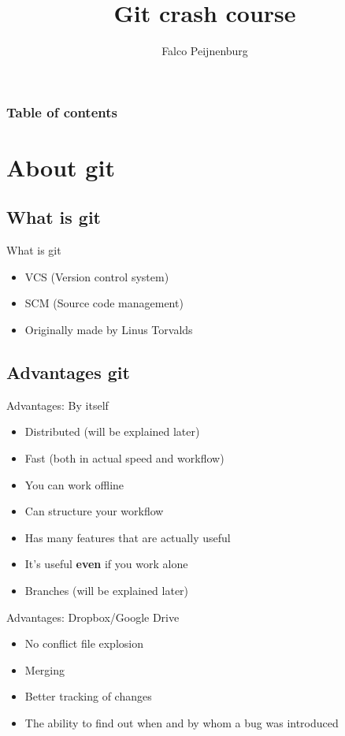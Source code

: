 \documentclass[10pt,a4paper]{beamer}
\author{Falco Peijnenburg}
\title[Git crash course\hspace{40mm} \insertframenumber/\inserttotalframenumber]{Git crash course}
\begin{document}
\frame{\titlepage}

\setcounter{tocdepth}{1}
\begin{frame}
\frametitle{Table of contents}
\tableofcontents[]
\end{frame}


\section{About git}
\subsection{What is git}
\begin{frame}{What is git}
\begin{itemize}
\item VCS (Version control system)
\item SCM (Source code management)
\item Originally made by Linus Torvalds
\end{itemize}
\end{frame}

\subsection{Advantages git}

\begin{frame}{Advantages: By itself}
\begin{itemize}
\item Distributed (will be explained later)
\item Fast (both in actual speed and workflow)
\item You can work offline
\item Can structure your workflow
\item Has many features that are actually useful
\item It's useful \textbf{even} if you work alone
\item Branches (will be explained later)

\end{itemize}
\end{frame}

\begin{frame}{Advantages: Dropbox/Google Drive}
\begin{itemize}
\item No conflict file explosion
\item Merging
\item Better tracking of changes
\item The ability to find out when and by whom a bug was introduced
\end{itemize}
\end{frame}
\end{document}
